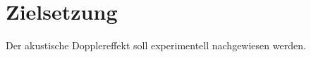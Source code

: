 
\section{Zielsetzung}
\label{sec:Zielsetzung}
Der akustische Dopplereffekt soll experimentell nachgewiesen werden.

